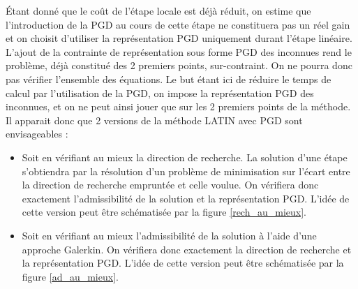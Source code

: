\documentclass[12pt,a4paper]{report}
\begin{document}
Étant donné que le coût de l'étape locale est déjà réduit, on estime que l'introduction de la PGD au cours de cette étape ne constituera pas un réel gain et on choisit d'utiliser la représentation PGD uniquement durant l'étape linéaire.\\

L'ajout de la contrainte de représentation sous forme PGD des inconnues rend le problème, déjà constitué des 2 premiers points, sur-contraint. On ne pourra donc pas vérifier l'ensemble des équations. Le but étant ici de réduire le temps de calcul par l'utilisation de la PGD, on impose la représentation PGD des inconnues, et on ne peut ainsi jouer que sur les 2 premiers points de la méthode. Il apparait donc que 2 versions de la méthode LATIN avec PGD sont envisageables :\\

\begin{itemize}
\item Soit en vérifiant \og au mieux\fg{} la direction de recherche. La solution d'une étape s'obtiendra par la résolution d'un problème de minimisation sur l'écart entre la direction de recherche empruntée et celle voulue. On vérifiera donc exactement l'admissibilité de la solution et la représentation PGD. L'idée de cette version peut être schématisée par la figure \ref{rech_au_mieux}.\\
\item Soit en vérifiant \og au mieux\fg{} l'admissibilité de la solution à l'aide d'une approche Galerkin. On vérifiera donc exactement la direction de recher\-che et la représentation PGD. L'idée de cette version peut être schématisée par la figure \ref{ad_au_mieux}.\\
\end{itemize}
 
 
 
\end{document}

